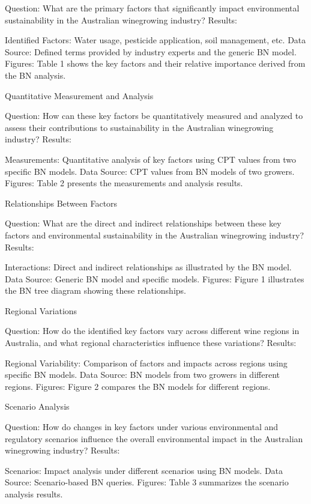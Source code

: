 Question: What are the primary factors that significantly impact environmental sustainability in the Australian winegrowing industry?
Results:

    Identified Factors: Water usage, pesticide application, soil management, etc.
    Data Source: Defined terms provided by industry experts and the generic BN model.
    Figures: Table 1 shows the key factors and their relative importance derived from the BN analysis.

Quantitative Measurement and Analysis

Question: How can these key factors be quantitatively measured and analyzed to assess their contributions to sustainability in the Australian winegrowing industry?
Results:

    Measurements: Quantitative analysis of key factors using CPT values from two specific BN models.
    Data Source: CPT values from BN models of two growers.
    Figures: Table 2 presents the measurements and analysis results.

Relationships Between Factors

Question: What are the direct and indirect relationships between these key factors and environmental sustainability in the Australian winegrowing industry?
Results:

    Interactions: Direct and indirect relationships as illustrated by the BN model.
    Data Source: Generic BN model and specific models.
    Figures: Figure 1 illustrates the BN tree diagram showing these relationships.

Regional Variations

Question: How do the identified key factors vary across different wine regions in Australia, and what regional characteristics influence these variations?
Results:

    Regional Variability: Comparison of factors and impacts across regions using specific BN models.
    Data Source: BN models from two growers in different regions.
    Figures: Figure 2 compares the BN models for different regions.

Scenario Analysis

Question: How do changes in key factors under various environmental and regulatory scenarios influence the overall environmental impact in the Australian winegrowing industry?
Results:

    Scenarios: Impact analysis under different scenarios using BN models.
    Data Source: Scenario-based BN queries.
    Figures: Table 3 summarizes the scenario analysis results.

